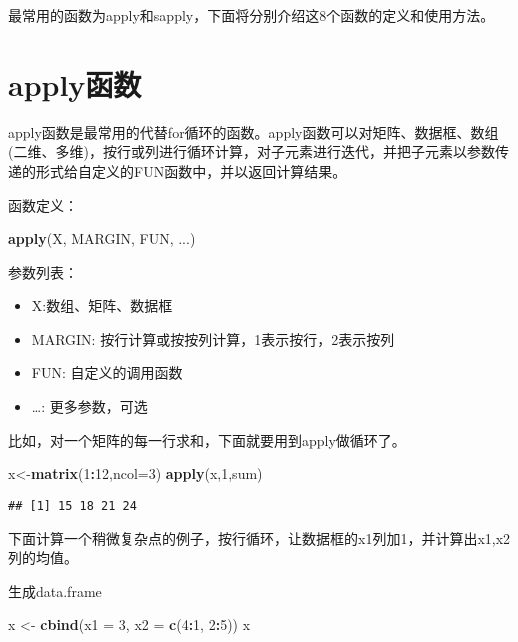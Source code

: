 \documentclass[]{book}
\newenvironment{Shaded}{\begin{snugshade}}{\end{snugshade}}
\newcommand{\DataTypeTok}[1]{\textcolor[rgb]{0.13,0.29,0.53}{#1}}
\newcommand{\DecValTok}[1]{\textcolor[rgb]{0.00,0.00,0.81}{#1}}
\newcommand{\KeywordTok}[1]{\textcolor[rgb]{0.13,0.29,0.53}{\textbf{#1}}}
\newcommand{\NormalTok}[1]{#1}
\newcommand{\OperatorTok}[1]{\textcolor[rgb]{0.81,0.36,0.00}{\textbf{#1}}}
\newcommand{\StringTok}[1]{\textcolor[rgb]{0.31,0.60,0.02}{#1}}
\providecommand{\tightlist}{%
  \setlength{\itemsep}{0pt}\setlength{\parskip}{0pt}}
\begin{document}
最常用的函数为apply和sapply，下面将分别介绍这8个函数的定义和使用方法。

\hypertarget{apply}{%
\section{apply函数}\label{apply}}

apply函数是最常用的代替for循环的函数。apply函数可以对矩阵、数据框、数组(二维、多维)，按行或列进行循环计算，对子元素进行迭代，并把子元素以参数传递的形式给自定义的FUN函数中，并以返回计算结果。

函数定义：

\begin{Shaded}
\begin{Highlighting}[]
\KeywordTok{apply}\NormalTok{(X, MARGIN, FUN, ...)}
\end{Highlighting}
\end{Shaded}

参数列表：

\begin{itemize}
\tightlist
\item
  X:数组、矩阵、数据框
\item
  MARGIN: 按行计算或按按列计算，1表示按行，2表示按列
\item
  FUN: 自定义的调用函数
\item
  \ldots{}: 更多参数，可选
\end{itemize}

比如，对一个矩阵的每一行求和，下面就要用到apply做循环了。

\begin{Shaded}
\begin{Highlighting}[]
\NormalTok{x<-}\KeywordTok{matrix}\NormalTok{(}\DecValTok{1}\OperatorTok{:}\DecValTok{12}\NormalTok{,}\DataTypeTok{ncol=}\DecValTok{3}\NormalTok{)}
\KeywordTok{apply}\NormalTok{(x,}\DecValTok{1}\NormalTok{,sum)}
\end{Highlighting}
\end{Shaded}

\begin{verbatim}
## [1] 15 18 21 24
\end{verbatim}

下面计算一个稍微复杂点的例子，按行循环，让数据框的x1列加1，并计算出x1,x2列的均值。

生成data.frame

\begin{Shaded}
\begin{Highlighting}[]
\NormalTok{x <-}\StringTok{ }\KeywordTok{cbind}\NormalTok{(}\DataTypeTok{x1 =} \DecValTok{3}\NormalTok{, }\DataTypeTok{x2 =} \KeywordTok{c}\NormalTok{(}\DecValTok{4}\OperatorTok{:}\DecValTok{1}\NormalTok{, }\DecValTok{2}\OperatorTok{:}\DecValTok{5}\NormalTok{))}
\NormalTok{x}
\end{Highlighting}
\end{Shaded}
\end{document}
